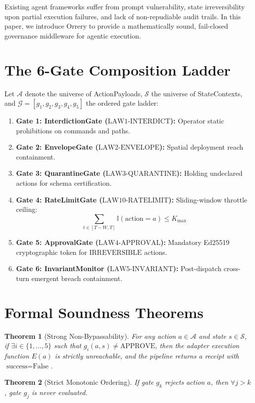 \documentclass[11pt,a4paper]{article}
\newtheorem{theorem}{Theorem}
\begin{document}
Existing agent frameworks suffer from prompt vulnerability, state irreversibility upon partial execution failures, and lack of non-repudiable audit trails. In this paper, we introduce Orrery to provide a mathematically sound, fail-closed governance middleware for agentic execution.

\section{The 6-Gate Composition Ladder}
Let $\mathcal{A}$ denote the universe of ActionPayloads, $\mathcal{S}$ the universe of StateContexts, and $\mathcal{G} = [g_1, g_2, g_3, g_4, g_5]$ the ordered gate ladder:
\begin{enumerate}
    \item \textbf{Gate 1: InterdictionGate ($\text{LAW1-INTERDICT}$):} Operator static prohibitions on commands and paths.
    \item \textbf{Gate 2: EnvelopeGate ($\text{LAW2-ENVELOPE}$):} Spatial deployment reach containment.
    \item \textbf{Gate 3: QuarantineGate ($\text{LAW3-QUARANTINE}$):} Holding undeclared actions for schema certification.
    \item \textbf{Gate 4: RateLimitGate ($\text{LAW10-RATELIMIT}$):} Sliding-window throttle ceiling:
    $$\sum_{t \in [T - W, T]} \mathbb{I}(\text{action} = a) \le K_{\text{max}}$$
    \item \textbf{Gate 5: ApprovalGate ($\text{LAW4-APPROVAL}$):} Mandatory Ed25519 cryptographic token for $\text{IRREVERSIBLE}$ actions.
    \item \textbf{Gate 6: InvariantMonitor ($\text{LAW5-INVARIANT}$):} Post-dispatch cross-turn emergent breach containment.
\end{enumerate}

\section{Formal Soundness Theorems}
\begin{theorem}[Strong Non-Bypassability]
For any action $a \in \mathcal{A}$ and state $s \in \mathcal{S}$, if $\exists i \in \{1, \dots, 5\}$ such that $g_i(a, s) \neq \text{APPROVE}$, then the adapter execution function $E(a)$ is strictly unreachable, and the pipeline returns a receipt with $\text{success} = \text{False}$.
\end{theorem}

\begin{theorem}[Strict Monotonic Ordering]
If gate $g_k$ rejects action $a$, then $\forall j > k$, gate $g_j$ is never evaluated.
\end{theorem}
\end{document}
